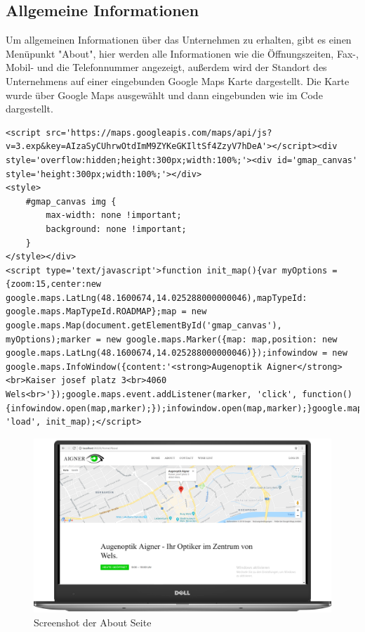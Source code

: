 \subsection{Allgemeine Informationen}
Um allgemeinen Informationen über das Unternehmen zu erhalten, gibt es einen Menüpunkt "About", hier werden alle Informationen wie die Öffnungszeiten, Fax-, Mobil- und die Telefonnummer angezeigt, außerdem wird der Standort des Unternehmens auf einer eingebunden Google Maps Karte dargestellt.
Die Karte wurde über Google Maps ausgewählt und dann eingebunden wie im Code dargestellt.
\begin{lstlisting}
<script src='https://maps.googleapis.com/maps/api/js?v=3.exp&key=AIzaSyCUhrwOtdImM9ZYKeGKIltSf4ZzyV7hDeA'></script><div style='overflow:hidden;height:300px;width:100%;'><div id='gmap_canvas' style='height:300px;width:100%;'></div>
<style>
    #gmap_canvas img {
        max-width: none !important;
        background: none !important;
    }
</style></div>
<script type='text/javascript'>function init_map(){var myOptions = {zoom:15,center:new google.maps.LatLng(48.1600674,14.025288000000046),mapTypeId: google.maps.MapTypeId.ROADMAP};map = new google.maps.Map(document.getElementById('gmap_canvas'), myOptions);marker = new google.maps.Marker({map: map,position: new google.maps.LatLng(48.1600674,14.025288000000046)});infowindow = new google.maps.InfoWindow({content:'<strong>Augenoptik Aigner</strong><br>Kaiser josef platz 3<br>4060 Wels<br>'});google.maps.event.addListener(marker, 'click', function(){infowindow.open(map,marker);});infowindow.open(map,marker);}google.maps.event.addDomListener(window, 'load', init_map);</script>
\end{lstlisting}

\begin{figure}[H]
\begin{center}
	\includegraphics[scale=.2]{images/About.png}
\end{center}
	\caption{Screenshot der About Seite}
	\label{fig:sample}
\end{figure}

